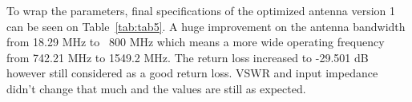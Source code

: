 \documentclass[conference]{IEEEtran}
\begin{document}






To wrap the parameters, final specifications of the optimized antenna version 1 can be seen on Table~\ref{tab:tab5}. A huge improvement on the antenna bandwidth from 18.29 MHz to ~800 MHz which means a more wide operating frequency from 742.21 MHz to 1549.2 MHz. The return loss increased to -29.501 dB however still considered as a good return loss. VSWR and input impedance didn't change that much and the values are still as expected.
\end{document}
